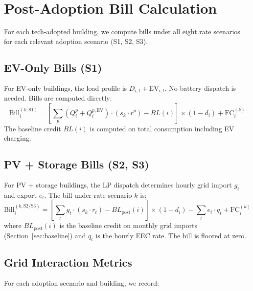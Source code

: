 \documentclass[11pt]{article}
\begin{document}
\section{Post-Adoption Bill Calculation}
\label{sec:postadopt}

For each tech-adopted building, we compute bills under all eight rate scenarios for each relevant adoption scenario (S1, S2, S3).

\subsection{EV-Only Bills (S1)}

For EV-only buildings, the load profile is $D_{i,t} + \text{EV}_{i,t}$. No battery dispatch is needed. Bills are computed directly:
\begin{equation}
\text{Bill}_i^{(k, \text{S1})} = \left[\sum_p (Q_i^p + Q_i^{p,\text{EV}}) \cdot (s_k \cdot r^p) - BL(i)\right] \times (1 - d_i) + \text{FC}_i^{(k)}
\end{equation}
The baseline credit $BL(i)$ is computed on total consumption including EV charging.

\subsection{PV + Storage Bills (S2, S3)}

For PV + storage buildings, the LP dispatch determines hourly grid import $g_t$ and export $e_t$. The bill under rate scenario $k$ is:
\begin{equation}
\text{Bill}_i^{(k, \text{S2/S3})} = \left[\sum_t g_t \cdot (s_k \cdot r_t) - BL_{\text{post}}(i)\right] \times (1 - d_i) - \sum_t e_t \cdot q_t + \text{FC}_i^{(k)}
\end{equation}
where $BL_{\text{post}}(i)$ is the baseline credit on monthly grid imports (Section~\ref{sec:baseline}) and $q_t$ is the hourly EEC rate. The bill is floored at zero.

\subsection{Grid Interaction Metrics}

For each adoption scenario and building, we record:
\end{document}
